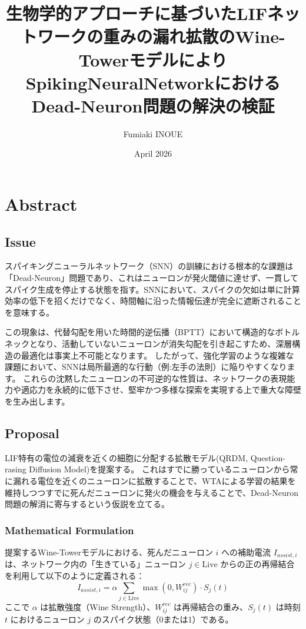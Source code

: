 \documentclass[paper=a4, fontsize=11pt]{jlreq}
\title{生物学的アプローチに基づいたLIFネットワークの重みの漏れ拡散のWine-TowerモデルによりSpikingNeuralNetworkにおけるDead-Neuron問題の解決の検証}
\author{Fumiaki INOUE}
\date{April 2026}
\begin{document}
\maketitle

\section*{Abstract}
\subsection*{Issue}

スパイキングニューラルネットワーク（SNN）の訓練における根本的な課題は「Dead-Neuron」問題であり、これはニューロンが発火閾値に達せず、一貫してスパイク生成を停止する状態を指す\cite{Zenke_2018}。SNNにおいて、スパイクの欠如は単に計算効率の低下を招くだけでなく、時間軸に沿った情報伝達が完全に遮断されることを意味する\cite{Zenke_2018}。

この現象は、代替勾配を用いた時間的逆伝播（BPTT）において構造的なボトルネックとなり、活動していないニューロンが消失勾配を引き起こすため、深層構造の最適化は事実上不可能となります。
したがって、強化学習のような複雑な課題において、SNNは局所最適的な行動（例:左手の法則）に陥りやすくなります。
これらの沈黙したニューロンの不可逆的な性質は、ネットワークの表現能力や適応力を永続的に低下させ、堅牢かつ多様な探索を実現する上で重大な障壁を生み出します。

\subsection*{Proposal}
LIF\cite{abbott1999lapicque}特有の電位の減衰を近くの細胞に分配する拡散モデル(QRDM, Question-rasing Diffusion Model)を提案する。
これはすでに勝っているニューロンから常に漏れる電位を近くのニューロンに拡散することで、WTAによる学習の結果を維持しつつすでに死んだニューロンに発火の機会を与えることで、Dead-Neuron問題の解消に寄与するという仮説を立てる。

\subsubsection*{Mathematical Formulation}
提案するWine-Towerモデルにおける、死んだニューロン $i$ への補助電流 $I_{assist,i}$ は、ネットワーク内の「生きている」ニューロン $j \in \text{Live}$ からの正の再帰結合を利用して以下のように定義される：
\begin{equation}
I_{assist,i} = \alpha \sum_{j \in \text{Live}} \max(0, W_{ij}^{rec}) \cdot S_j(t)
\end{equation}
ここで $\alpha$ は拡散強度（Wine Strength）、$W_{ij}^{rec}$ は再帰結合の重み、$S_j(t)$ は時刻 $t$ におけるニューロン $j$ のスパイク状態（0または1）である。
\end{document}
